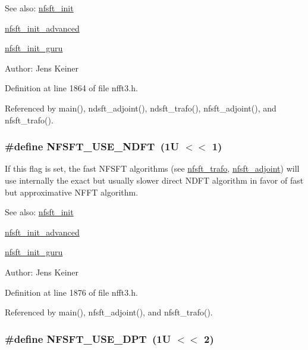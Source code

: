 \begin{Desc}
\item[See also:]\hyperlink{group__nfsft_g65cda3f4a3edc5eb39c697cf34b1f0b9}{nfsft\_\-init} 

\hyperlink{group__nfsft_ge7dca3e41afdb39e8c518af414878c18}{nfsft\_\-init\_\-advanced} 

\hyperlink{group__nfsft_g60466ed37643b6b7b7c1638056604d2b}{nfsft\_\-init\_\-guru} \end{Desc}
\begin{Desc}
\item[Author:]Jens Keiner \end{Desc}


Definition at line 1864 of file nfft3.h.

Referenced by main(), ndsft\_\-adjoint(), ndsft\_\-trafo(), nfsft\_\-adjoint(), and nfsft\_\-trafo().\hypertarget{group__nfsft_gba029560a4a506c8f2dad185511db827}{
\subsubsection{\setlength{\rightskip}{0pt plus 5cm}\#define NFSFT\_\-USE\_\-NDFT~(1U $<$$<$ 1)}}
\label{group__nfsft_gba029560a4a506c8f2dad185511db827}


If this flag is set, the fast NFSFT algorithms (see \hyperlink{group__nfsft_g5796fc68c432d46dfcab7abd8c56ee22}{nfsft\_\-trafo}, \hyperlink{group__nfsft_g813bb48d404c7286310733c99a81a169}{nfsft\_\-adjoint}) will use internally the exact but usually slower direct NDFT algorithm in favor of fast but approximative NFFT algorithm. 

\begin{Desc}
\item[See also:]\hyperlink{group__nfsft_g65cda3f4a3edc5eb39c697cf34b1f0b9}{nfsft\_\-init} 

\hyperlink{group__nfsft_ge7dca3e41afdb39e8c518af414878c18}{nfsft\_\-init\_\-advanced} 

\hyperlink{group__nfsft_g60466ed37643b6b7b7c1638056604d2b}{nfsft\_\-init\_\-guru} \end{Desc}
\begin{Desc}
\item[Author:]Jens Keiner \end{Desc}


Definition at line 1876 of file nfft3.h.

Referenced by main(), nfsft\_\-adjoint(), and nfsft\_\-trafo().\hypertarget{group__nfsft_g6b9eed1e7bcf862dcc3111509075fcbb}{
\subsubsection{\setlength{\rightskip}{0pt plus 5cm}\#define NFSFT\_\-USE\_\-DPT~(1U $<$$<$ 2)}}
\label{group__nfsft_g6b9eed1e7bcf862dcc3111509075fcbb}


